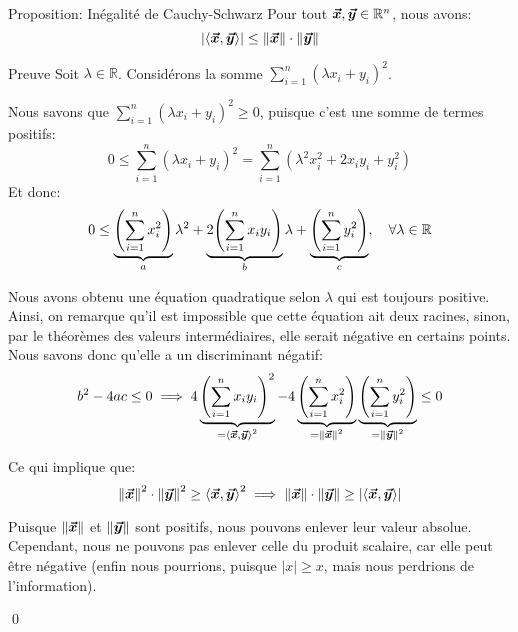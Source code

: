 \documentclass[a4paper]{article}
\begin{document}
\begin{parag}{Proposition: Inégalité de Cauchy-Schwarz}
    Pour tout $\bm{\protect\vec{x}}, \bm{\protect\vec{y}} \in \mathbb{R}^n$, nous avons: 
    \[\left|\left<\bvec{x}, \bvec{y}\right>\right|\leq \left\|\bvec{x}\right\| \cdot \left\|\bvec{y}\right\|\]
    
    \demonstrationaconnaitre

    \begin{subparag}{Preuve}
        Soit $\lambda\in \mathbb{R}$. Considérons la somme $\sum_{i=1}^{n} \left(\lambda x_i + y_i\right)^2$.

        Nous savons que $\sum_{i=1}^{n} \left(\lambda x_i + y_i\right)^2 \geq 0$, puisque c'est une somme de termes positifs: 
        \[0 \leq \sum_{i=1}^{n} \left(\lambda x_i + y_i\right)^2 = \sum_{i=1}^{n} \left(\lambda^2 x_i^2 + 2x_i y_i + y_i^2\right)\]
        Et donc: 
        \[0 \leq \underbrace{\left(\sum_{i=1}^{n} x_i^2\right)}_{a}\lambda^2 + \underbrace{2\left(\sum_{i=1}^{n} x_i y_i\right)}_{b} \lambda + \underbrace{\left(\sum_{i=1}^{n} y_i^2\right)}_{c}, \mathspace \forall \lambda \in \mathbb{R}\]

        Nous avons obtenu une équation quadratique selon $\lambda$ qui est toujours positive. Ainsi, on remarque qu'il est impossible que cette équation ait deux racines, sinon, par le théorèmes des valeurs intermédiaires, elle serait négative en certains points. Nous savons donc qu'elle a un discriminant négatif:
        \[b^2 - 4ac \leq 0 \implies 4\underbrace{\left(\sum_{i=1}^{n} x_i y_i\right)^2}_{= \left<\bvec{x}, \bvec{y}\right>^2} - 4\underbrace{\left(\sum_{i=1}^{n} x_i^2\right)}_{= \left\|\bvec{x}\right\|^2}\underbrace{\left(\sum_{i=1}^{n} y_i^2\right)}_{= \left\|\bvec{y}\right\|^2} \leq 0\]

        Ce qui implique que: 
        \[\left\|\bvec{x}\right\|^2 \cdot \left\|\bvec{y}\right\|^2 \geq \left<\bvec{x}, \bvec{y}\right>^2 \implies \left\|\bvec{x}\right\| \cdot \left\|\bvec{y}\right\| \geq \left|\left<\bvec{x}, \bvec{y}\right>\right|\]
        
        Puisque $\left\|\bvec{x}\right\|$ et $\left\|\bvec{y}\right\|$ sont positifs, nous pouvons enlever leur valeur absolue. Cependant, nous ne pouvons pas enlever celle du produit scalaire, car elle peut être négative (enfin nous pourrions, puisque $\left|x\right| \geq x$, mais nous perdrions de l'information).

        \qed
    \end{subparag}
\end{parag}
\end{document}
